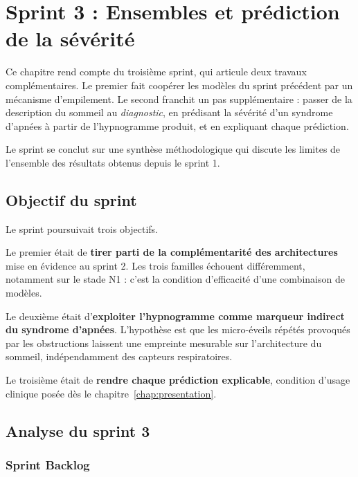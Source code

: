 \chapter{Sprint 3 : Ensembles et prédiction de la sévérité}
\label{chap:sprint3}


Ce chapitre rend compte du troisième sprint, qui articule deux travaux complémentaires.
Le premier fait coopérer les modèles du sprint précédent par un mécanisme d'empilement.
Le second franchit un pas supplémentaire : passer de la description du sommeil au
\emph{diagnostic}, en prédisant la sévérité d'un syndrome d'apnées à partir de
l'hypnogramme produit, et en expliquant chaque prédiction.

Le sprint se conclut sur une synthèse méthodologique qui discute les limites de
l'ensemble des résultats obtenus depuis le sprint 1.

\section{Objectif du sprint}

Le sprint poursuivait trois objectifs.

Le premier était de \textbf{tirer parti de la complémentarité des architectures} mise en
évidence au sprint 2. Les trois familles échouent différemment, notamment sur le stade
N1 : c'est la condition d'efficacité d'une combinaison de modèles.

Le deuxième était d'\textbf{exploiter l'hypnogramme comme marqueur indirect du syndrome
d'apnées}. L'hypothèse est que les micro-éveils répétés provoqués par les obstructions
laissent une empreinte mesurable sur l'architecture du sommeil, indépendamment des
capteurs respiratoires.

Le troisième était de \textbf{rendre chaque prédiction explicable}, condition d'usage
clinique posée dès le chapitre~\ref{chap:presentation}.

\section{Analyse du sprint 3}

\subsection{Sprint Backlog}

